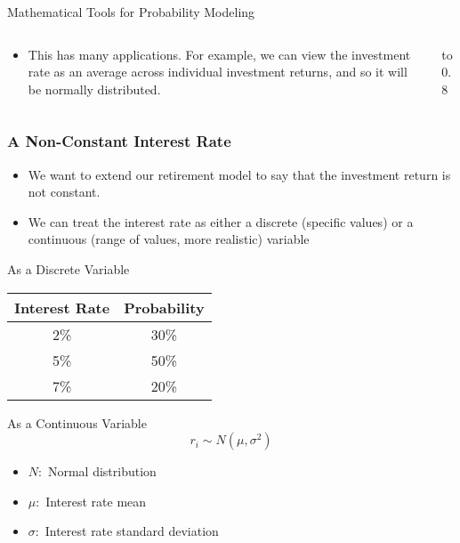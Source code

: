 \documentclass[handout, 11pt]{beamer}
\begin{document}
\begin{section}{Mathematical Tools for Probability Modeling}
\begin{frame}
\begin{columns}
\begin{column}{0.5\textwidth}
{\begin{itemize}
\vfill
\item This has many applications. For example, we can view the investment rate as an average across individual investment returns, and so it will be normally distributed.
\end{itemize}}
\end{column}
\begin{column}{0.5\textwidth}
\vbox to 0.8
\end{column}
\end{columns}
\end{frame}
\begin{frame}
\frametitle{A Non-Constant Interest Rate}
\scriptsize
\begin{itemize}
\item We want to extend our retirement model to say that the investment return is not constant.
\item We can treat the interest rate as either a discrete (specific values) or a continuous (range of values, more realistic) variable
\end{itemize}
\begin{block}{As a Discrete Variable}
\begin{center}
\begin{tabular}{cc}
Interest Rate & Probability\\

\midrule
2\% & 30\%\\
5\% & 50\%\\
7\% & 20\%\\

\end{tabular}
\end{center}
\end{block}
\begin{block}{As a Continuous Variable}
\begin{equation}
	r_i \sim N(\mu, \sigma^2)
\end{equation}
\vspace{-0.5cm}
\begin{itemize}
\item $N:$
Normal distribution
\item $\mu:$
Interest rate mean
\item $\sigma:$
Interest rate standard deviation
\end{itemize}
\end{block}
\end{frame}
\end{section}
\end{document}
